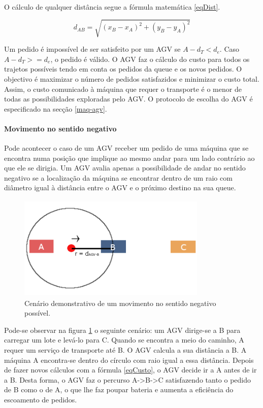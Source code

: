 \begin{titlepage}
O cálculo de qualquer distância segue a fórmula matemática \ref{eqDist}.

\begin{equation}
d_{AB} = \sqrt{(x_{B}-x_{A})^{2}+(y_{B}-y_{A})^{2}}
\label{eqDist}
\end{equation}\newline

Um pedido é impossível de ser satisfeito por um AGV se $A-d_{T} < d_{e}$. Caso $A-d_{T} >= d_{e}$, o pedido é válido. O AGV faz o cálculo do custo para todos os trajetos possíveis tendo em conta os pedidos da queue e os novos pedidos. O objectivo é maximizar o número de pedidos satisfazidos e minimizar o custo total. Assim, o custo comunicado à máquina que requer o transporte é o menor de todas as possibilidades exploradas pelo AGV. O protocolo de escolha do AGV é especificado na secção \ref{maq-agv}.

\paragraph{Movimento no sentido negativo}

Pode acontecer o caso de um AGV receber um pedido de uma máquina que se encontra numa posição que implique ao mesmo andar para um lado contrário ao que ele se dirigia. Um AGV avalia apenas a possibilidade de andar no sentido negativo se a localização da máquina se encontrar dentro de um raio com diâmetro igual à distância entre o AGV e o próximo destino na sua queue.\newline

\begin{figure}[H]
  \centering
    \includegraphics[width=9cm, height = 5cm]{negativeMotion.png}
  \caption{Cenário demonstrativo de um movimento no sentido negativo possível.}
  \label{negativeMotion}
\end{figure}

Pode-se observar na figura \ref{negativeMotion} o seguinte cenário: um AGV dirige-se a B para carregar um lote e levá-lo para C. Quando se encontra a meio do caminho, A requer um serviço de transporte até B. O AGV calcula a sua distância a B. A máquina A encontra-se dentro do círculo com raio igual a essa distância. Depois de fazer novos cálculos com a fórmula \ref{eqCusto}, o AGV decide ir a A antes de ir a B. Desta forma, o AGV faz o percurso A->B->C satisfazendo tanto o pedido de B como o de A, o que lhe faz poupar bateria e aumenta a eficiência do escoamento de pedidos.


\end{titlepage}
